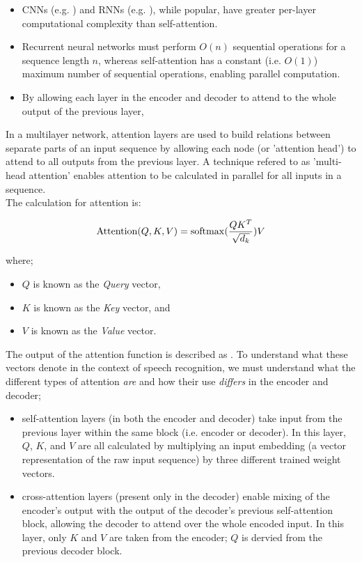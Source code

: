 \begin{itemize}
        \item CNNs (e.g. \cite{zeghidour2018fully}) and RNNs (e.g. \cite{graves2014towards}), while popular, have greater per-layer computational complexity than self-attention\cite{vaswani2017attention}.
        \item Recurrent neural networks must perform $O(n)$ sequential operations for a sequence length $n$, whereas self-attention has a constant (i.e. $O(1)$) maximum number of sequential operations, enabling parallel computation\cite{vaswani2017attention}.
        \item By allowing each layer in the encoder and decoder to attend to the whole output of the previous layer, 
\end{itemize}

In a multilayer network, attention layers are used to build relations between separate parts of an input sequence by allowing each node (or 'attention head'\cite{shaw2018self}) to attend to all outputs from the previous layer.
A technique refered to as 'multi-head attention'\cite{vaswani2017attention} enables attention to be calculated in parallel for all inputs in a sequence.\\

The calculation for attention is:

\[ \text{Attention}(Q,K,V) = \operatorname{softmax} (\frac{QK^T}{\sqrt{d_k}})V \]

where;

\begin{itemize}
        \item $Q$ is known as the \emph{Query} vector,
        \item $K$ is known as the \emph{Key} vector, and
        \item $V$ is known as the \emph{Value} vector.
\end{itemize}

The output of the attention function is described as \cite{vaswani2017attention}.
To understand what these vectors denote in the context of speech recognition, we must understand what the different types of attention \emph{are} and how their use \emph{differs} in the encoder and decoder;

\begin{itemize}
        \item self-attention layers (in both the encoder and decoder) take input from the previous layer within the same block (i.e. encoder or decoder).
        In this layer, $Q$, $K$, and $V$ are all calculated by multiplying an input embedding (a vector representation of the raw input sequence) by three different trained weight vectors.
        \item cross-attention layers (present only in the decoder) enable mixing of the encoder's output with the output of the decoder's previous self-attention block, allowing the decoder to attend over the whole encoded input.
        In this layer, only $K$ and $V$ are taken from the encoder; $Q$ is dervied from the previous decoder block.
\end{itemize}


